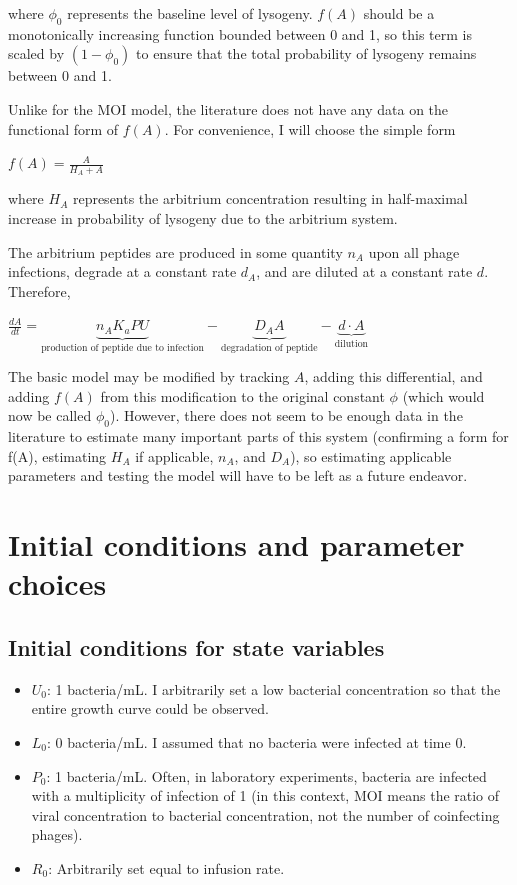 \documentclass{article}
\begin{document}
where $\phi_0$ represents the baseline level of lysogeny. $f(A)$ should be a monotonically increasing function bounded between 0 and 1, so this term is scaled by $(1-\phi_0)$ to ensure that the total probability of lysogeny remains between 0 and 1.

Unlike for the MOI model, the literature does not have any data on the functional form of $f(A)$. For convenience, I will choose the simple form 

\begin{center}
$f(A) = \frac{A}{H_A+A}$
\end{center}

where $H_A$ represents the arbitrium concentration resulting in half-maximal increase in probability of lysogeny due to the arbitrium system.

The arbitrium peptides are produced in some quantity $n_A$ upon all phage infections, degrade at a constant rate $d_A$, and are diluted at a constant rate $d$. Therefore, 
\begin{center}
$\frac{dA}{dt} = \underbrace{n_AK_aPU}_{\text{production of peptide due to infection}}-\underbrace{D_AA}_{\text{degradation of peptide}}-\underbrace{d \cdot A}_{\text{dilution}}$
\end{center}

The basic model may be modified by tracking $A$, adding this differential, and adding $f(A)$ from this modification to the original constant $\phi$ (which would now be called $\phi_0$). However, there does not seem to be enough data in the literature to estimate many important parts of this system (confirming a form for f(A), estimating $H_A$ if applicable, $n_A$, and $D_A$), so estimating applicable parameters and testing the model will have to be left as a future endeavor. 

\section{Initial conditions and parameter choices}

\subsection{Initial conditions for state variables}
\begin{itemize}
\item $U_0$: 1 bacteria/mL. I arbitrarily set a low bacterial concentration so that the entire growth curve could be observed.
\item $L_0$: 0 bacteria/mL. I assumed that no bacteria were infected at time 0.
\item $P_0$: 1 bacteria/mL. Often, in laboratory experiments, bacteria are infected with a multiplicity of infection of 1 (in this context, MOI means the ratio of viral concentration to bacterial concentration, not the number of coinfecting phages). 
\item $R_0$: Arbitrarily set equal to infusion rate. 
\end{itemize}
\end{document}
